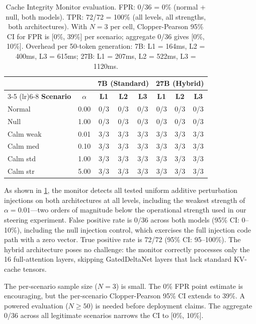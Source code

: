 \begin{table}[h]
\centering
\small
\begin{tabular}{lccccccc}
\toprule
& & \multicolumn{3}{c}{\textbf{7B (Standard)}} & \multicolumn{3}{c}{\textbf{27B (Hybrid)}} \\
\cmidrule(lr){3-5} \cmidrule(lr){6-8}
\textbf{Scenario} & \textbf{$\alpha$} & \textbf{L1} & \textbf{L2} & \textbf{L3} & \textbf{L1} & \textbf{L2} & \textbf{L3} \\
\midrule
Normal    & 0.00 & 0/3 & 0/3 & 0/3 & 0/3 & 0/3 & 0/3 \\
Null      & 1.00 & 0/3 & 0/3 & 0/3 & 0/3 & 0/3 & 0/3 \\
Calm weak & 0.01 & 3/3 & 3/3 & 3/3 & 3/3 & 3/3 & 3/3 \\
Calm med  & 0.10 & 3/3 & 3/3 & 3/3 & 3/3 & 3/3 & 3/3 \\
Calm std  & 1.00 & 3/3 & 3/3 & 3/3 & 3/3 & 3/3 & 3/3 \\
Calm str  & 5.00 & 3/3 & 3/3 & 3/3 & 3/3 & 3/3 & 3/3 \\
\bottomrule
\end{tabular}
\caption{Cache Integrity Monitor evaluation. FPR: 0/36 = 0\%
(normal + null, both models). TPR: 72/72 = 100\% (all levels, all
strengths, both architectures). With $N = 3$ per cell, Clopper-Pearson
95\% CI for FPR is [0\%, 39\%] per scenario; aggregate 0/36 gives
[0\%, 10\%]. Overhead per 50-token generation: 7B: L1 = 164ms,
L2 = 400ms, L3 = 615ms; 27B: L1 = 207ms, L2 = 522ms, L3 = 1120ms.}
\label{tab:cim_eval}
\end{table}

As shown in \cref{tab:cim_eval}, the monitor detects all tested
uniform additive perturbation injections on both architectures at all
levels, including the weakest strength of $\alpha = 0.01$---two orders
of magnitude below the operational strength used in our steering
experiment. False positive rate is 0/36 across both models (95\% CI:
0--10\%), including the null injection control, which exercises the
full injection code path with a zero vector. True positive rate is
72/72 (95\% CI: 95--100\%). The hybrid architecture poses no challenge: the
monitor correctly processes only the 16 full-attention layers, skipping
GatedDeltaNet layers that lack standard KV-cache tensors.

The per-scenario sample size ($N = 3$) is small. The 0\% FPR point
estimate is encouraging, but the per-scenario Clopper-Pearson 95\% CI
extends to 39\%. A powered evaluation ($N \geq 50$) is needed before
deployment claims. The aggregate 0/36 across all legitimate scenarios
narrows the CI to [0\%, 10\%].

